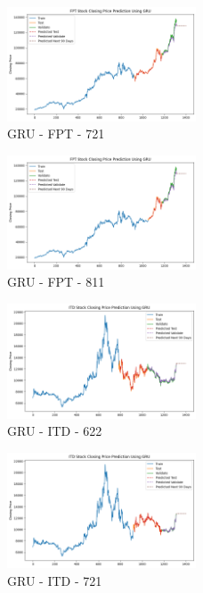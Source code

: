 \documentclass{ieeeojies}
\begin{document}
\begin{figure} [H]
    \centering
    \includegraphics[width=0.5\textwidth]{bibliography/Figure/GRU_FPT_721_90.png}
    \caption{GRU - FPT - 721}
    \label{fig:GRU_FPT_721_90}
\end{figure}
\begin{figure} [H]
    \centering
    \includegraphics[width=0.5\textwidth]{bibliography/Figure/GRU_FPT_811_90.png}
    \caption{GRU - FPT - 811}
    \label{fig:GRU_FPT_811_90}
\end{figure}
\begin{figure} [H]
    \centering
    \includegraphics[width=0.5\textwidth]{bibliography/Figure/GRU_ITD_622_90.png}
    \caption{GRU - ITD - 622}
    \label{fig:GRU_ITD_622_90}
\end{figure}
\begin{figure} [H]
    \centering
    \includegraphics[width=0.5\textwidth]{bibliography/Figure/GRU_ITD_721_90.png}
    \caption{GRU - ITD - 721}
    \label{fig:GRU_ITD_721_90}
\end{figure}
\end{document}
